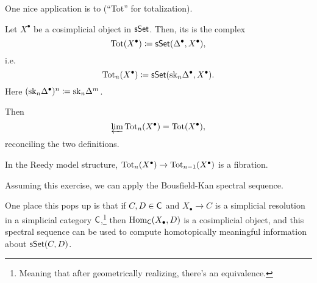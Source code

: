 One nice application is to  (``Tot'' for totalization).
\begin{defn}
Let $X^\bullet$ be a cosimplicial object in $\mathsf{sSet}$. Then, its  is the complex
\[\operatorname{Tot}(X^\bullet) \coloneqq \mathsf{sSet}(\Delta^\bullet, X^\bullet),\]
i.e.
\[\operatorname{Tot}_n(X^\bullet) \coloneqq \mathsf{sSet}(\mathrm{sk}_n\Delta^\bullet, X^\bullet).\]
Here $(\mathrm{sk}_n\Delta^\bullet)^n\coloneqq \mathrm{sk}_n\Delta^m$.
\end{defn}
Then
\[\varprojlim\operatorname{Tot}_n(X^\bullet) = \operatorname{Tot}(X^\bullet),\]
reconciling the two definitions.
\begin{ex}
In the Reedy model structure, $\operatorname{Tot}_n(X^\bullet)\to\operatorname{Tot}_{n-1}(X^\bullet)$ is a fibration.
\end{ex}
Assuming this exercise, we can apply the Bousfield-Kan spectral sequence.

One place this pops up is that if $C,D\in\mathsf C$ and $X_\bullet\to C$ is a simplicial resolution in a simplicial
category $\mathsf C$,\footnote{Meaning that after geometrically realizing, there's an equivalence.} then
$\operatorname{Hom}_{\mathsf C}(X_\bullet, D)$ is a cosimplicial object, and this spectral sequence can be used to compute
homotopically meaningful information about $\mathsf{sSet}(C, D)$.

